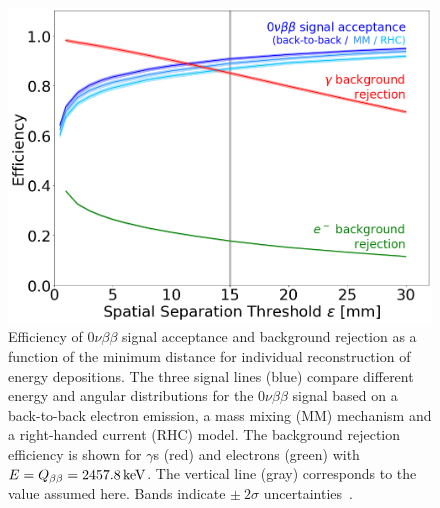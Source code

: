 \begin{figure}[!htbp]
\begin{center}
\includegraphics[width=0.99\columnwidth]{fig_0vbb_acceptance.png}
\caption{Efficiency of $0\nu\beta\beta$ signal acceptance and background rejection as a function of the minimum distance for individual reconstruction of energy depositions. The three signal lines (blue) compare different energy and angular distributions for the $0\nu\beta\beta$ signal based on a back-to-back electron emission, a mass mixing (MM) mechanism and a right-handed current (RHC) model. The background rejection efficiency is shown for $\gamma$s (red) and electrons (green) with $E=Q_{\beta\beta}=2457.8\, \mathrm{keV}$. The vertical line (gray) corresponds to the value assumed here. Bands indicate $\pm~2\sigma$ uncertainties~\cite{Agostini:2020adk}.}\label{fig:0vbb_acceptance}
\end{center}
\end{figure}

